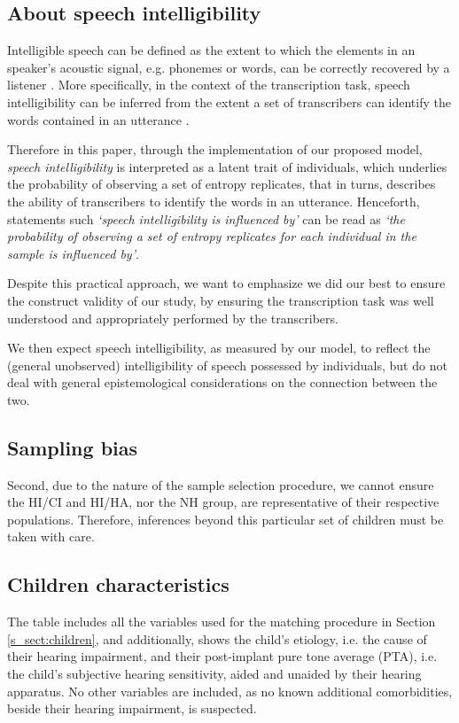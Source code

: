 \subsection{About speech intelligibility}
%
Intelligible speech can be defined as the extent to which the elements in an speaker's acoustic signal, e.g. phonemes or words, can be correctly recovered by a listener \citep{Kent_et_al_1989, Whitehill_et_al_2004, vanHeuven_2008, Freeman_et_al_2017}. More specifically, in the context of the transcription task, speech intelligibility can be inferred from the extent a set of transcribers can identify the words contained in an utterance \cite{Boonen_et_al_2021}.

Therefore in this paper, through the implementation of our proposed model, \textit{speech intelligibility} is interpreted as a latent trait of individuals, which underlies the probability of observing a set of entropy replicates, that in turns, describes the ability of transcribers to identify the words in an utterance. Henceforth, statements such \textit{`speech intelligibility is influenced by'} can be read as \textit{`the probability of observing a set of entropy replicates for each individual in the sample is influenced by'}. 

Despite this practical approach, we want to emphasize we did our best to ensure the construct validity of our study, by ensuring the transcription task was well understood and appropriately performed by the transcribers.

We then expect speech intelligibility, as measured by our model, to reflect the (general unobserved) intelligibility of speech possessed by individuals, but do not deal with general epistemological considerations on the connection between the two.
%
%
\subsection{Sampling bias}
%
Second, due to the nature of the sample selection procedure, we cannot ensure the HI/CI and HI/HA, nor the NH group, are representative of their respective populations. Therefore, inferences beyond this particular set of children must be taken with care.
%
%

\subsection{Children characteristics} \label{appA:characteristics}
%
The table includes all the variables used for the matching procedure in Section \ref{s_sect:children}, and additionally, shows the child's etiology, i.e. the cause of their hearing impairment, and their post-implant pure tone average (PTA), i.e. the child's subjective hearing sensitivity, aided and unaided by their hearing apparatus. No other variables are included, as no known additional comorbidities, beside their hearing impairment, is suspected.

